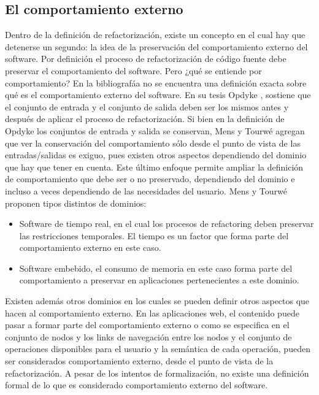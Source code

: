 \subsection{El comportamiento externo}
Dentro de la definición de refactorización, existe un concepto en el cual
hay que detenerse un segundo: la idea de la preservación del comportamiento
externo del software. Por definición el proceso de refactorización de código
fuente debe preservar el comportamiento del software. Pero ¿qué se entiende
por comportamiento? En la bibliografáa no se encuentra una definición exacta
sobre qué es el comportamiento externo del software. En su tesis Opdyke
\cite{REF05}, sostiene que el conjunto de entrada y el conjunto de salida deben ser
los mismos antes y después de aplicar el proceso de refactorización. Si bien
en la definición de Opdyke los conjuntos de entrada y salida se conservan,
Mens y Tourwé \cite{REF06} agregan que ver la conservación del comportamiento sólo
desde el punto de vista de las entradas/salidas es exiguo, pues existen otros
aspectos dependiendo del dominio que hay que tener en cuenta. Este último
enfoque permite ampliar la definición de comportamiento que debe ser o
no preservado, dependiendo del dominio e incluso a veces dependiendo de las
necesidades del usuario. Mens y Tourwé proponen tipos distintos de dominios:

\begin{itemize}
	\item Software de tiempo real, en el cual los procesos de refactoring deben
	preservar las restricciones temporales. El tiempo es un factor que forma
	parte del comportamiento externo en este caso.
	\item Software embebido, el consumo de memoria en este caso forma parte
	del comportamiento a preservar en aplicaciones pertenecientes a este
	dominio.

\end{itemize}

Existen además otros dominios en los cuales se pueden definir otros aspectos
que hacen al comportamiento externo. En las aplicaciones web, el
contenido puede pasar a formar parte del comportamiento externo o como
se especifica en  el conjunto de nodos y los links de navegación entre los
nodos y el conjunto de operaciones disponibles para el usuario y la semántica
de cada operación, pueden ser considerados comportamiento externo, desde
el punto de vista de la refactorización.
A pesar de los intentos de formalización, no existe una definición formal
de lo que es considerado comportamiento externo del software.


